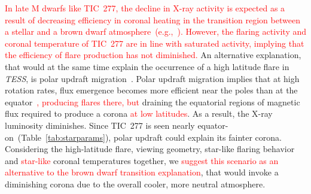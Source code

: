 \documentclass[twocolumn]{aastex631}
\begin{document}

\textcolor{red}{In late M dwarfs like TIC~277, the decline in X-ray activity is expected as a result of decreasing efficiency in coronal heating in the transition region between a stellar and a brown dwarf atmosphere~(e.g.,~\citealt{williams2014trends}). However, the flaring activity and coronal temperature of TIC~277 are in line with saturated activity, implying that the efficiency of flare production has not diminished.} An alternative explanation, that would at the same time explain the occurrence of a high latitude flare in \textit{TESS}, is polar updraft migration~\citep{stepien2001rosat}. Polar updraft migration implies that at high rotation rates, flux emergence becomes more efficient near the poles than at the equator~\citep{weber2016modeling}\textcolor{red}{, producing flares there, but} draining the equatorial regions of magnetic flux required to produce a corona \textcolor{red}{at low latitudes}. As a result, the X-ray luminosity diminishes. Since TIC~277 is seen nearly equator-on~(Table~\ref{tab:starparams}), polar updraft could explain its fainter corona. Considering the high-latitude flare, viewing geometry, star-like flaring behavior and \textcolor{red}{star-like} coronal temperatures together, we \textcolor{red}{suggest this scenario as an alternative to the brown dwarf transition explanation}, that would invoke a diminishing corona due to the overall cooler, more neutral atmosphere. 








 
\end{document}
